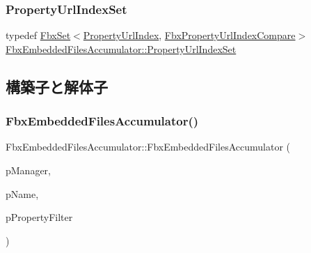 \mbox{\label{class_fbx_embedded_files_accumulator_a007ad10c417fc8b5373ab6358f5fb5be}} 
\subsubsection{\texorpdfstring{Property\+Url\+Index\+Set}{PropertyUrlIndexSet}}
{\footnotesize\ttfamily typedef \hyperlink{class_fbx_set}{Fbx\+Set}$<$\hyperlink{struct_fbx_embedded_files_accumulator_1_1_property_url_index}{Property\+Url\+Index}, \hyperlink{struct_fbx_embedded_files_accumulator_1_1_fbx_property_url_index_compare}{Fbx\+Property\+Url\+Index\+Compare}$>$ \hyperlink{class_fbx_embedded_files_accumulator_a007ad10c417fc8b5373ab6358f5fb5be}{Fbx\+Embedded\+Files\+Accumulator\+::\+Property\+Url\+Index\+Set}}



\subsection{構築子と解体子}
\mbox{\label{class_fbx_embedded_files_accumulator_a22c32a739a59987e432fabe5f46c460e}} 
\subsubsection{\texorpdfstring{Fbx\+Embedded\+Files\+Accumulator()}{FbxEmbeddedFilesAccumulator()}}
{\footnotesize\ttfamily Fbx\+Embedded\+Files\+Accumulator\+::\+Fbx\+Embedded\+Files\+Accumulator (\begin{DoxyParamCaption}\item[{\hyperlink{class_fbx_manager}{Fbx\+Manager} \&}]{p\+Manager,  }\item[{const char $\ast$}]{p\+Name,  }\item[{\hyperlink{class_fbx_set}{Fbx\+Set}$<$ \hyperlink{class_fbx_string}{Fbx\+String} $>$ \&}]{p\+Property\+Filter }\end{DoxyParamCaption})}

